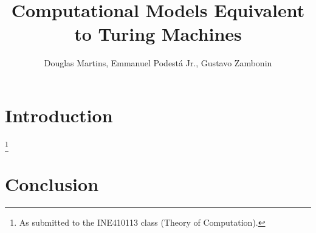 \documentclass[12pt]{article}
\title{Computational Models Equivalent to Turing Machines}
\author{Douglas Martins\inst{1}, Emmanuel Podestá Jr.\inst{1}, Gustavo Zambonin\inst{1}}
\begin{document}
 

\maketitle

\section{Introduction}\label{sec:intro}
 


\footnote{As submitted to the INE410113 class (Theory of Computation).}


\section{Conclusion}\label{sec:conc}




\end{document}
